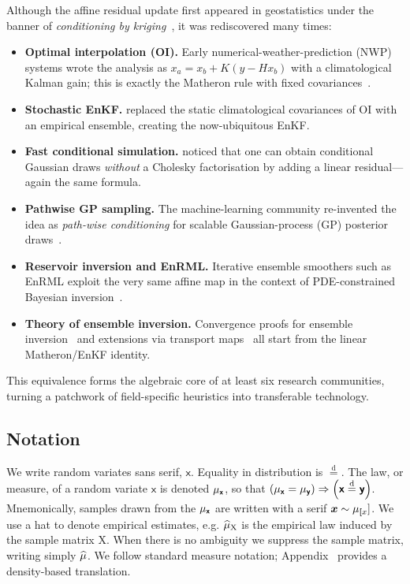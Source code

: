 \documentclass[wcp]{jmlr} %
\newcommand{\vv}[1]{\boldsymbol{#1}}
\newcommand{\mm}[1]{\mathrm{#1}}
\newcommand{\rv}[1]{\mathsf{#1}}
\newcommand{\vrv}[1]{\vv{\rv{#1}}}
\newcommand{\disteq}{\stackrel{\mathrm{d}}{=}}
\begin{document}
Although the affine residual update first appeared in geostatistics under the banner of \emph{conditioning by kriging}~\citep{Chiles2018Kriging}, it was rediscovered many times:
\begin{itemize}
    \item \textbf{Optimal interpolation (OI).}  Early numerical-weather-prediction (NWP) systems wrote the analysis as
    $x_a = x_b + K(y - Hx_b)$ with a climatological Kalman gain; this is exactly the Matheron rule with fixed covariances~\citep{Hunt2007LETKF}.
    \item \textbf{Stochastic EnKF.}  \citet{Evensen2003EnKF} replaced the static climatological covariances of OI with an empirical ensemble, creating the now-ubiquitous EnKF.
    \item \textbf{Fast conditional simulation.}  \citet{Doucet2010Note} noticed that one can obtain conditional Gaussian draws \emph{without} a Cholesky factorisation by adding a linear residual—again the same formula.
    \item \textbf{Pathwise GP sampling.}  The machine-learning community re-invented the idea as \emph{path-wise conditioning} for scalable Gaussian-process (GP) posterior draws~\citep{Wilson2020Efficiently,Wilson2021Pathwise,Borovitskiy2020Matern}.
    \item \textbf{Reservoir inversion and EnRML.}  Iterative ensemble smoothers such as EnRML exploit the very same affine map in the context of PDE-constrained Bayesian inversion~\citep{Chen2012EnRML}.
    \item \textbf{Theory of ensemble inversion.}  Convergence proofs for ensemble inversion~\citep{Schillings2016EnKFInverse} and extensions via transport maps~\citep{Spantini2022Coupling} all start from the linear Matheron/EnKF identity.
\end{itemize}

This equivalence forms the algebraic core of at least six research communities, turning a patchwork of field-specific heuristics into transferable technology.

\subsection{Notation}

We write random variates sans serif, $\vrv{x}$.
Equality in distribution is $\disteq$.
The law, or measure, of a random variate $\vrv{x}$ is denoted $\Law[\vrv{x}]$,
so that $\left(\Law[\vrv{x}]=\Law[\vrv{y}]\right) \Rightarrow \left(\vrv{x}\disteq\vrv{y}\right)$.
Mnemonically, samples drawn from the $\Law[\vrv{x}]$ are written with a serif $\vv{x}\sim\Law[\vrv[x]]$.
We use a hat to denote empirical estimates, e.g. \(\ELaw[\mm{X}]\) is the empirical law induced by the sample matrix \(\mm{X}\).
When there is no ambiguity we suppress the sample matrix, writing simply \(\widehat{\Law}\).
We follow standard measure notation; Appendix~ provides a density-based translation.
\end{document}

